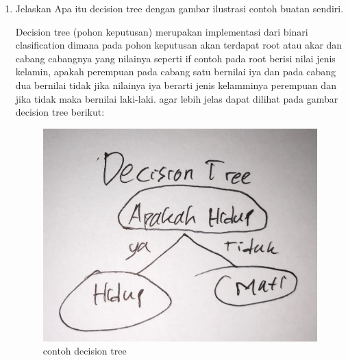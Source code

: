 \begin{enumerate}
\item Jelaskan Apa itu decision tree dengan gambar ilustrasi contoh buatan sendiri.\par
Decision tree (pohon keputusan) merupakan implementasi dari binari clasification dimana pada pohon keputusan akan terdapat root atau akar dan cabang cabangnya yang nilainya seperti if contoh pada root berisi nilai jenis kelamin, apakah perempuan pada cabang satu bernilai iya dan pada cabang dua bernilai tidak jika nilainya iya berarti jenis kelamminya perempuan dan jika tidak maka bernilai laki-laki.
agar lebih jelas dapat dilihat pada gambar decision tree berikut:
\begin{figure}[ht]
\centering
\includegraphics[scale=0.2]{figures/1174042/chapter2/1,8.jpeg}
\caption{contoh decision tree}
\label{contoh}
\end{figure}



\end{enumerate}

